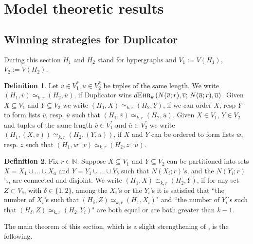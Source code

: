 \documentclass[12pt,notitlepage,a4paper]{article}
\theoremstyle{definition}
\newtheorem{definition}{Definition}[section]
\newcommand{\N}{\mathbb{N}}
\newcommand{\ehr}{\textsc{Ehr}}
\begin{document}
\section{Model theoretic results}

\subsection{Winning strategies for Duplicator}

During this section $H_1$ and $H_2$ stand for
hypergraphs and $V_1:=V(H_1)$, $V_2:=V(H_2)$.

\begin{definition} \label{def:similar}
Let $\overline{v} \in V_1^*, 
\overline{u} \in V_2^*$ be tuples of the same length.
We write $(H_1,\overline{v})\simeq_{k,r}(H_2, \overline{u})$, if Duplicator wins
$d\ehr_k\left(N(\overline{v};r),
\overline{v};\, N(\overline{u};r),\overline{u}\right)$.
Given $X\subseteq V_1$ and $Y\subseteq V_2$
we write $(H_1,X)\simeq_{k,r} (H_2,Y)$, if we can order $X$, resp $Y$ to form
lists $\overline{v}$, resp. $\overline{u}$ such that 
$(H_1,\overline{v})\simeq_{k,r}(H_2,\overline{u})$. 
Given $X\in V_1$, $Y\in V_2$ and 
tuples of the same length $\overline{v}\in V_1^*$ and
$\overline{u}\in V_2^*$ we write
 $\left(H_1, (X,\overline{v})  \right)
\simeq_{k,r} \left(H_2, (Y,\overline{u})  \right)$, if
$X$ and $Y$ can be ordered to form lists
$\overline{w}$, resp. $\overline{z}$ such that
$(H_1,\overline{w}^\smallfrown \overline{v})
\simeq_{k,r} (H_2,\overline{z}^\smallfrown \overline{u})$. 
\end{definition}

\begin{definition} \label{def:analogous}
Fix $r\in \N$. Suppose $X\subseteq V_1$ and 
$Y\subseteq V_2$ can
be partitioned into sets $X=X_1\cup \dots \cup X_a$
and $Y=Y_1\cup \dots \cup Y_b$ 
such that $N(X_i;r)$'s, and the
$N(Y_i;r)$'s, are connected and disjoint. 
We write $(H_1,X)\cong_{k,r} (H_2,Y)$, 
if for any set $Z\subset V_\delta$, with $\delta\in \{1,2\}$,
among the $X_i$'s or the $Y_i$'s
it is satisfied that ``the number of $X_i$'s  
such that $(H_\delta, Z) \simeq_{k,r} (H_1,X_i)$" 
and ``the number of $Y_i$'s such that
$(H_\delta,Z)\simeq_{k,r} (H_2,Y_i)$"
are both equal or are both greater than $k-1$.
\end{definition}

The main theorem of this section, which
is a slight strengthening of \cite[Theorem 
2.6.7]{spencer2013strange}, is the following.
\end{document}

